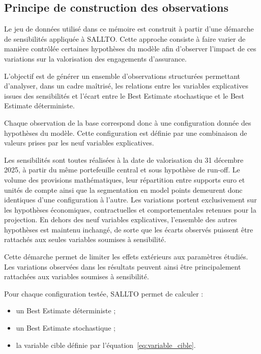 \subsection{Principe de construction des observations}

Le jeu de données utilisé dans ce mémoire est construit à partir d'une démarche de sensibilités appliquée à SALLTO. Cette approche consiste à faire varier de manière contrôlée certaines hypothèses du modèle afin d'observer l'impact de ces variations sur la valorisation des engagements d'assurance.

L'objectif est de générer un ensemble d'observations structurées permettant d'analyser, dans un cadre maîtrisé, les relations entre les variables explicatives issues des sensibilités et l'écart entre le Best Estimate stochastique et le Best Estimate déterministe.

Chaque observation de la base correspond donc à une configuration donnée des hypothèses du modèle. Cette configuration est définie par une combinaison de valeurs prises par les neuf variables explicatives.

Les sensibilités sont toutes réalisées à la date de valorisation du 31 décembre 2025, à partir du même portefeuille central et sous hypothèse de run-off. Le volume des provisions mathématiques, leur répartition entre supports euro et unités de compte ainsi que la segmentation en model points demeurent donc identiques d'une configuration à l'autre. Les variations portent exclusivement sur les hypothèses économiques, contractuelles et comportementales retenues pour la projection. En dehors des neuf variables explicatives, l'ensemble des autres hypothèses est maintenu inchangé, de sorte que les écarts observés puissent être rattachés aux seules variables soumises à sensibilité.

Cette démarche permet de limiter les effets extérieurs aux paramètres étudiés. Les variations observées dans les résultats peuvent ainsi être principalement rattachées aux variables soumises à sensibilité.

Pour chaque configuration testée, SALLTO permet de calculer :

\begin{itemize}[label=\textemdash, nosep, leftmargin=2.5em]
    \item un Best Estimate déterministe ;
    \item un Best Estimate stochastique ;
    \item la variable cible définie par l'équation~\eqref{eq:variable_cible}.
\end{itemize}


